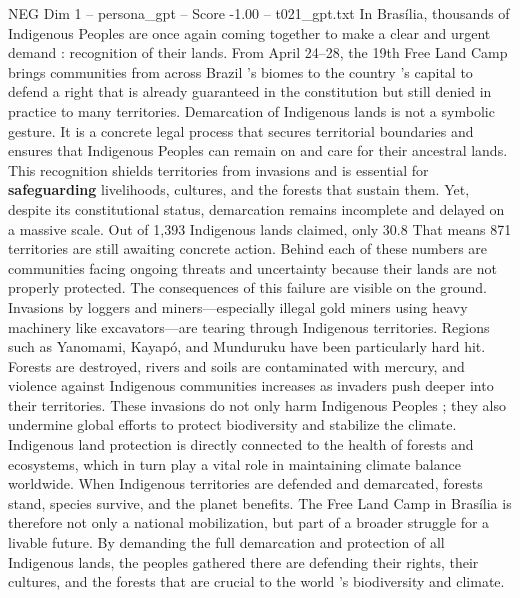 \begin{textsample}{NEG Dim 1 – persona\_gpt – Score -1.00 – t021\_gpt.txt}  \label{ex:f1_neg_034}
In Brasília, thousands of Indigenous Peoples are once again coming together to make a clear and urgent demand : recognition of their lands.
From April 24–28, the 19th Free Land Camp brings communities from across Brazil ’s biomes to the country ’s capital to defend a right that is already guaranteed in the constitution but still denied in practice to many territories.
Demarcation of Indigenous lands is not a symbolic gesture.
It is a concrete legal process that secures territorial boundaries and ensures that Indigenous Peoples can remain on and care for their ancestral lands.
This recognition shields territories from invasions and is essential for \textbf{safeguarding} livelihoods, cultures, and the forests that sustain them.
Yet, despite its constitutional status, demarcation remains incomplete and delayed on a massive scale.
Out of 1,393 Indigenous lands claimed, only 30.8 %
That means 871 territories are still awaiting concrete action.
Behind each of these numbers are communities facing ongoing threats and uncertainty because their lands are not properly protected.
The consequences of this failure are visible on the ground.
Invasions by loggers and miners—especially illegal gold miners using heavy machinery like excavators—are tearing through Indigenous territories.
Regions such as Yanomami, Kayapó, and Munduruku have been particularly hard hit.
Forests are destroyed, rivers and soils are contaminated with mercury, and violence against Indigenous communities increases as invaders push deeper into their territories.
These invasions do not only harm Indigenous Peoples ; they also undermine global efforts to protect biodiversity and stabilize the climate.
Indigenous land protection is directly connected to the health of forests and ecosystems, which in turn play a vital role in maintaining climate balance worldwide.
When Indigenous territories are defended and demarcated, forests stand, species survive, and the planet benefits.
The Free Land Camp in Brasília is therefore not only a national mobilization, but part of a broader struggle for a livable future.
By demanding the full demarcation and protection of all Indigenous lands, the peoples gathered there are defending their rights, their cultures, and the forests that are crucial to the world ’s biodiversity and climate.

\end{textsample}
